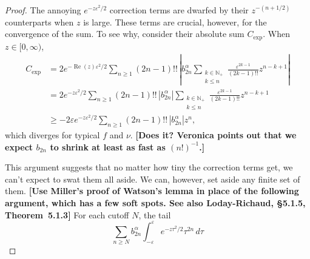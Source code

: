 \documentclass{article}
\theoremstyle{definition}
\begin{document}
\begin{proof}
The annoying $e^{-z\varepsilon^2/2}$ correction terms are dwarfed by their $z^{-(n+1/2)}$ counterparts when $z$ is large. These terms are crucial, however, for the convergence of the sum. To see why, consider their absolute sum $C_\text{exp}$. When $z \in [0, \infty)$,
\begin{align*}
C_\text{exp} & = 2e^{-\operatorname{Re}(z)\varepsilon^2/2} \sum_{n \ge 1} (2n-1)!!\,\left| b_{2n}^\alpha \sum_{\substack{k \in \mathbb{N}_+ \\ k \le n}} \frac{\varepsilon^{2k-1}}{(2k-1)!!} z^{n-k+1} \right| \\
& = 2e^{-z\varepsilon^2/2} \sum_{n \ge 1} (2n-1)!!\,\left|b_{2n}^\alpha\right| \sum_{\substack{k \in \mathbb{N}_+ \\ k \le n}} \frac{\varepsilon^{2k-1}}{(2k-1)!!} z^{n-k+1} \\
& \ge -2\varepsilon e^{-z\varepsilon^2/2} \sum_{n \ge 1} (2n-1)!!\,\left|b_{2n}^\alpha\right| z^n,
\end{align*}
which diverges for typical $f$ and $\nu$. \textbf{[Does it? Veronica points out that we expect $b_{2n}$ to shrink at least as fast as $(n!)^{-1}$.]}

This argument suggests that no matter how tiny the correction terms get, we can't expect to swat them all aside. We can, however, set aside any finite set of them. \color{violet}\textbf{[Use Miller's proof of Watson's lemma in place of the following argument, which has a few soft spots. See also Loday-Richaud, \S 5.1.5, Theorem~5.1.3]} For each cutoff $N$, the tail
\[ \sum_{n \ge N} b_{2n}^\alpha \int_{-\varepsilon}^\varepsilon e^{-z\tau^2/2} \tau^{2n}\,d\tau \]


\end{proof}
\end{document}
